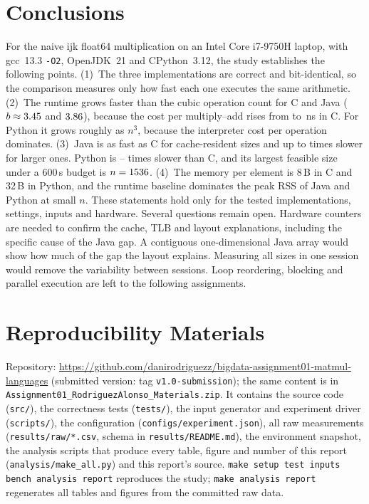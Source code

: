 \documentclass[conference,a4paper]{IEEEtran}
\begin{document}
\section{Conclusions}
\label{sec:conclusions}
For the naive ijk float64 multiplication on an Intel Core i7-9750H laptop, with gcc~13.3 \texttt{-O2}, OpenJDK~21
and CPython~3.12, the study establishes the following points.
(1)~The three implementations are correct and bit-identical, so the comparison measures only how fast each one
executes the same arithmetic.
(2)~The runtime grows faster than the cubic operation count for C and Java ($b\approx3.45$ and $3.86$),
because the cost per multiply--add rises from \NsMaddCMin{} to \NsMaddCMax\,ns in C. For Python it grows roughly as
$n^3$, because the interpreter cost per operation dominates.
(3)~Java is as fast as C for cache-resident sizes and up to \RatioJavaMax{} times slower for larger ones. Python is
\RatioPythonMin--\RatioPythonMax{} times slower than C, and its largest feasible size under a 600\,s budget is
$n=1536$.
(4)~The memory per element is 8\,B in C and 32\,B in Python, and the runtime baseline dominates the peak RSS of
Java and Python at small $n$.
These statements hold only for the tested implementations, settings, inputs and hardware. Several questions remain
open. Hardware counters are needed to confirm the cache, TLB and layout explanations, including the specific cause
of the Java gap. A contiguous one-dimensional Java array would show how much of the gap the layout explains.
Measuring all sizes in one session would remove the variability between sessions. Loop reordering, blocking and
parallel execution are left to the following assignments.

\section*{Reproducibility Materials}
Repository: \url{https://github.com/danirodriguezz/bigdata-assignment01-matmul-languages} (submitted version: tag
\texttt{v1.0-submission}); the same content is in \texttt{Assignment01\_RodriguezAlonso\_Materials.zip}. It
contains the source code (\texttt{src/}), the correctness tests (\texttt{tests/}), the input generator and
experiment driver (\texttt{scripts/}), the configuration (\texttt{configs/experiment.json}), all raw measurements
(\texttt{results/raw/*.csv}, schema in \texttt{results/README.md}), the environment snapshot, the analysis scripts
that produce every table, figure and number of this report (\texttt{analysis/make\_all.py}) and this report's
source. \texttt{make setup test inputs bench analysis report} reproduces the study; \texttt{make analysis report}
regenerates all tables and figures from the committed raw data.
\end{document}
